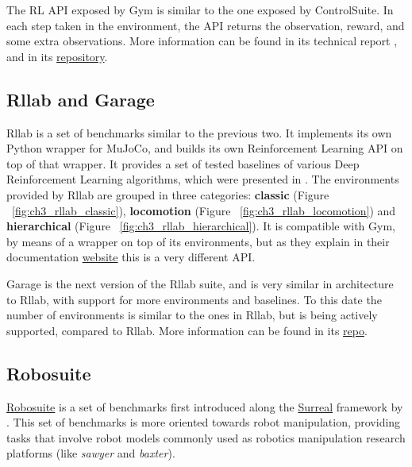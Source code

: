 The RL API exposed by Gym is similar to the one exposed by ControlSuite. 
In each step taken in the environment, the API returns the observation, 
reward, and some extra observations. More information can be found in its 
technical report \citep{Gym}, and in its \href{https://github.com/openai/gym}{repository}.

\subsection{Rllab and Garage}

Rllab is a set of benchmarks similar to the previous two. It implements its own 
Python wrapper for MuJoCo, and builds its own Reinforcement Learning API on top 
of that wrapper. It provides a set of tested baselines of various Deep Reinforcement 
Learning algorithms, which were presented in \cite{Rllab}. The environments provided 
by Rllab are grouped in three categories: \textbf{classic} (Figure ~\ref{fig:ch3_rllab_classic}), 
\textbf{locomotion} (Figure ~\ref{fig:ch3_rllab_locomotion}) and \textbf{hierarchical} 
(Figure ~\ref{fig:ch3_rllab_hierarchical}). It is compatible with Gym, by means of 
a wrapper on top of its environments, but as they explain in their documentation 
\href{https://rllab.readthedocs.io/en/latest/user/gym_integration.html}{website} 
this is a very different API.

\figBenchmarkRllabClassic

\figBenchmarkRllabLocomotion

\figBenchmarkRllabHierarchical

Garage is the next version of the Rllab suite, and is very similar in architecture 
to Rllab, with support for more environments and baselines. To this date the number 
of environments is similar to the ones in Rllab, but is being actively supported, 
compared to Rllab. More information can be found in its \href{https://github.com/rlworkgroup/garage}{repo}.

\subsection{Robosuite}
 
\href{https://github.com/StanfordVL/robosuite/}{Robosuite} is a set of benchmarks first 
introduced along the \href{https://surreal.stanford.edu/}{Surreal} 
framework by \cite{Surreal}. This set of benchmarks is more oriented towards robot manipulation,
providing tasks that involve robot models commonly used as robotics manipulation research platforms 
(like \textit{sawyer} and \textit{baxter}).

